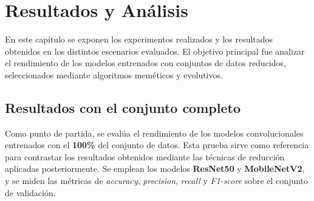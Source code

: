 
\chapter{Resultados y Análisis}\label{ch:resultados-y-analisis}
En este capítulo se exponen los experimentos realizados y los resultados obtenidos en los distintos escenarios evaluados.
El objetivo principal fue analizar el rendimiento de los modelos entrenados con conjuntos de datos reducidos,
seleccionados mediante algoritmos meméticos y evolutivos.


\section{Resultados con el conjunto completo}\label{sec:resultados-conjunto-completo}
Como punto de partida, se evalúa el rendimiento de los modelos convolucionales entrenados con el \textbf{100\%} del conjunto de datos.
Esta prueba sirve como referencia para contrastar los resultados obtenidos mediante las técnicas de reducción aplicadas posteriormente.
Se emplean los modelos \textbf{ResNet50} y \textbf{MobileNetV2}, y se miden las métricas de \textit{accuracy},
\textit{precision}, \textit{recall} y \textit{F1-score} sobre el conjunto de validación.

\begin{table}[htp]
    \centering
    \caption{Comparativa de resultados del \textbf{100\%} con los modelos \textbf{ResNet50} y \textbf{MobileNet}.}
    \label{tab:resultados-100-resnet50-mobilenet}
\end{table}

